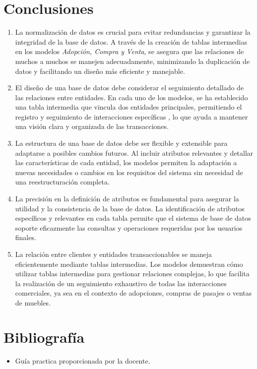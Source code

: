 \documentclass[12pt]{article}
\begin{document}
        \section{Conclusiones}
                \begin{enumerate}
                        \item La normalización de datos es crucial para evitar redundancias y garantizar la integridad de la base de datos. A través de la creación de tablas intermedias en los modelos \textit{Adopción, Compra y Venta}, se asegura que las relaciones de muchos a muchos se manejen adecuadamente, minimizando la duplicación de datos y facilitando un diseño más eficiente y manejable.
                        \item El diseño de una base de datos debe considerar el seguimiento detallado de las relaciones entre entidades. En cada uno de los modelos, se ha establecido una tabla intermedia que vincula dos entidades principales, permitiendo el registro y seguimiento de interacciones específicas , lo que ayuda a mantener una visión clara y organizada de las transacciones.
                        \item La estructura de una base de datos debe ser flexible y extensible para adaptarse a posibles cambios futuros. Al incluir atributos relevantes y detallar las características de cada entidad, los modelos permiten la adaptación a nuevas necesidades o cambios en los requisitos del sistema sin necesidad de una reestructuración completa.
                        \item La precisión en la definición de atributos es fundamental para asegurar la utilidad y la consistencia de la base de datos. La identificación de atributos específicos y relevantes en cada tabla permite que el sistema de base de datos soporte eficazmente las consultas y operaciones requeridas por los usuarios finales.
                        \item La relación entre clientes y entidades transaccionables se maneja eficientemente mediante tablas intermedias. Los modelos demuestran cómo utilizar tablas intermedias para gestionar relaciones complejas, lo que facilita la realización de un seguimiento exhaustivo de todas las interacciones comerciales, ya sea en el contexto de adopciones, compras de pasajes o ventas de muebles.
                \end{enumerate}


        \section{Bibliografía}
                \begin{itemize}
                        \item Guía practica proporcionada por la docente. 
                \end{itemize}
\end{document}
